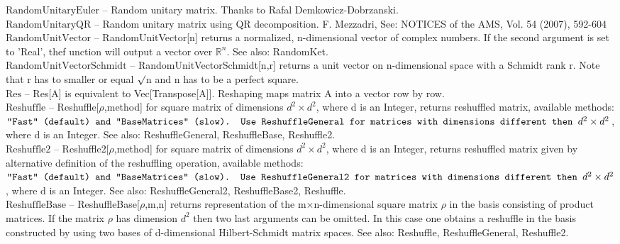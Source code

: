 \documentclass[a4paper,10pt]{scrartcl}
\begin{document}
\textbf{$ \text{RandomUnitaryEuler} $ }-- Random unitary matrix. Thanks to Rafal Demkowicz-Dobrzanski.$  $\\

\textbf{$ \text{RandomUnitaryQR} $ }-- Random unitary matrix using QR decomposition. F. Mezzadri, See: NOTICES of the AMS, Vol. 54 (2007), 592-604$  $\\

\textbf{$ \text{RandomUnitVector} $ }-- RandomUnitVector[n] returns a normalized, n-dimensional vector of complex numbers. If the second argument is set to 'Real', thef unction will output a vector over $ \mathbb{R}^n $. See also: RandomKet.$  $\\

\textbf{$ \text{RandomUnitVectorSchmidt} $ }-- RandomUnitVectorSchmidt[n,r] returns a unit vector on n-dimensional space with a Schmidt rank r. Note that r has to smaller or equal $\surd $n and n has to be a perfect square.$  $\\

\textbf{$ \text{Res} $ }-- Res[A] is equivalent to Vec[Transpose[A]]. Reshaping maps matrix A into a vector row by row.$  $\\

\textbf{$ \text{Reshuffle} $ }-- Reshuffle[$\rho $,method] for square matrix of dimensions $ d^2\times d^2 $, where d is an Integer, returns reshuffled matrix, available methods: $\texttt{"$ $Fast$\texttt{"}$ (default) and $\texttt{"}$BaseMatrices$\texttt{"}$ (slow). Use ReshuffleGeneral for matrices with dimensions different then }d^2\times d^2 $, where d is an Integer. See also: ReshuffleGeneral, ReshuffleBase, Reshuffle2.$  $\\

\textbf{$ \text{Reshuffle2} $ }-- Reshuffle2[$\rho $,method] for square matrix of dimensions $ d^2\times d^2 $, where d is an Integer, returns reshuffled matrix given by alternative definition of the reshuffling operation, available methods: $\texttt{"$ $Fast$\texttt{"}$ (default) and $\texttt{"}$BaseMatrices$\texttt{"}$ (slow). Use ReshuffleGeneral2 for matrices with dimensions different then }d^2\times d^2 $, where d is an Integer. See also: ReshuffleGeneral2, ReshuffleBase2, Reshuffle.$  $\\

\textbf{$ \text{ReshuffleBase} $ }-- ReshuffleBase[$\rho $,m,n] returns representation of the m$\times $n-dimensional square matrix $\rho $ in the basis consisting of product matrices. If  the matrix $\rho $ has dimension $ d^2 $ then two last arguments can be omitted. In this case one obtains a reshuffle in the basis constructed by using two bases of d-dimensional Hilbert-Schmidt matrix spaces. See also: Reshuffle, ReshuffleGeneral, Reshuffle2.$  $\\
\end{document}

